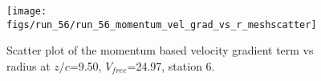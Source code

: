 \begin{figure}[H]
\centering
\texttt{[image: figs/run\_56/run\_56\_momentum\_vel\_grad\_vs\_r\_meshscatter]}
\caption{Scatter plot of the momentum based velocity gradient term vs radius at $z/c$=9.50, $V_{free}$=24.97, station 6.}
\label{fig:run_56_momentum_vel_grad_vs_r_meshscatter}
\end{figure}


